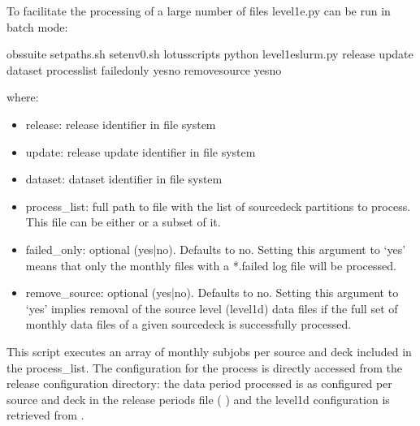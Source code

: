 \documentclass[letterpaper,10pt,english]{sphinxmanual}
\begin{document}
To facilitate the processing of a large number of files level1e.py can be run
in batch mode:

\begin{sphinxVerbatim}[commandchars=\\\{\}]
 obs\PYGZhy{}suite
 setpaths.sh
 setenv0.sh
 lotus\PYGZus{}scripts
python level1e\PYGZus{}slurm.py release update dataset  process\PYGZus{}list \PYGZhy{}\PYGZhy{}failed\PYGZus{}only yesno \PYGZhy{}\PYGZhy{}remove\PYGZus{}source yesno
\end{sphinxVerbatim}

where:
\begin{itemize}
\item {} 
release: release identifier in file system

\item {} 
update: release update identifier in file system

\item {} 
dataset: dataset identifier in file system

\item {} 
process\_list: full path to file with the list of source\sphinxhyphen{}deck partitions to
process. This file can be either {\hyperref[\detokenize{index:process-list-file}]{}} or a subset of it.

\item {} 
failed\_only: optional (yes|no). Defaults to no. Setting this argument to ‘yes’
means that only the monthly files with a *.failed log file will be processed.

\item {} 
remove\_source: optional (yes|no). Defaults to no. Setting this argument to ‘yes’
implies removal of the source level (level1d) data files if the full set of
monthly data files of a given source\sphinxhyphen{}deck is successfully processed.

\end{itemize}

This script executes an array of monthly subjobs per source and deck included in
the process\_list. The configuration for the process is directly accessed from
the release configuration directory: the data period processed is as configured
per source and deck in the release periods file ( {\hyperref[\detokenize{index:release-periods-file}]{}})
and the level1d configuration is retrieved from {\hyperref[\detokenize{index:level1e-config-file}]{}}.
\end{document}
